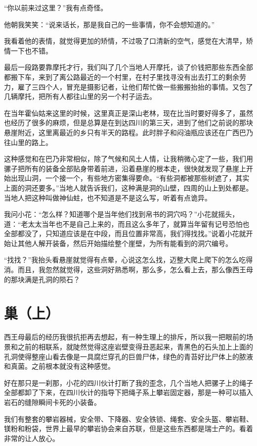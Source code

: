 “你以前来过这里？”我有点奇怪。

他朝我笑笑：“说来话长，那是我自己的一些事情，你不会想知道的。”

我看着他的表情，就觉得更加的矫情，不过吸了口清新的空气，感觉在大清早，矫情一下也不错。

最后一段路要靠摩托才行，我们叫了几个当地人开摩托，谈了价钱把那些东西全部都搬下车，来到了离公路最近的一个村里，在村子里找寻没有出去打工的剩余劳力，雇了三四个人，冒充是摄影记者，让他们帮忙做一些搬搬抬抬的事情。又包了几辆摩托，把所有人都往山里的另一个村子运去。

在当年霍仙姑来这里的时候，这里真正是深山老林，现在比当时要好得多了，虽然也经历了很多的麻烦，但是总算是在到达四川的第三天，进到了他们之前说的那块悬崖附近，这里离最近的乡只有半天的路程。此时胖子和闷油瓶应该还在广西巴乃往山里的路上。

这种感觉和在巴乃非常相似，除了气候和风土人情，让我稍微心定了一些，我们用骡子把所有的装备全部贴身带着前进，沿着悬崖的根本走，很快就发现了悬崖上开始出现山洞，一个接一个，有些地方密集得要命。“有些洞都被那些树遮了，其实上面的洞还要多。”当地人就告诉我们，这种满是洞的山壁，四周的山上到处都是。当地人把这种叫做神仙蛀，也不知道是不是这么写，听着有点诡异。

我问小花：“怎么样？知道哪个是当年他们找到帛书的洞穴吗？”小花就摇头，道：“老太太当年也不是自己上来的，而且这么多年了，就算当年留有记号恐怕也全部都没了，只知道应该是在中段，而且位置非常高，我们得找找。”说着小花就开始让其他人解开装备，然后开始描绘整个崖壁，为所有能看到的洞穴编号。

“找找？”我抬头看悬崖就觉得有点晕，心说这怎么找，迈整大爬上爬下的怎么吃得消。而且，我忽然就觉得，这些洞好熟悉啊，那么多，怎么看上去，那么像西王母的那块满是孔洞的陨石？

\chapter{巢（上）}

西王母最后的经历我很抗拒再去想起，有一种生理上的排斥，所以我一把眼前的场景和之前的相联系，就陡然觉得这座岩壁变得丑恶起来，青黑色的石头加上上面的孔洞使得整座山看去像是一具腐烂穿孔的巨兽尸体，绿色的青苔好比尸体上的脓液和真菌。之前根本就没有这种感觉。

好在那只是一刹那，小花的四川伙计打断了我的歪念，几个当地人把骡子上的绳子全部都卸了下来，在四川伙计的指导下把绳子系上攀岩固定器，那是一种可以插入岩石的缝隙瞬间卡死的小装备。

我们有整套的攀岩器械，安全带、下降器、安全铁锁、绳套、安全头盔、攀岩鞋、镁粉和粉袋，世界上最早的攀岩协会来自苏联，但是这些东西都是瑞士产的。看着非常的让人放心。

